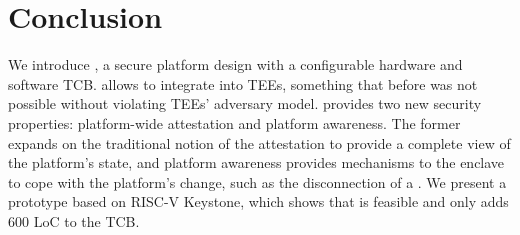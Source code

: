 \section{Conclusion}
\label{sec:conclusion}



We introduce \name, a secure platform design with a configurable hardware and software TCB. \name allows to integrate \sphw into TEEs, something that before was not possible without violating TEEs' adversary model.  
\name provides two new security properties: platform-wide attestation and platform awareness. The former expands on the traditional notion of the attestation to provide a complete view of the platform's state, and platform awareness provides mechanisms to the enclave to cope with the platform's change, such as the disconnection of a \sphw. We present a prototype based on RISC-V Keystone, which shows that \name is feasible and only adds $600$ LoC to the TCB.